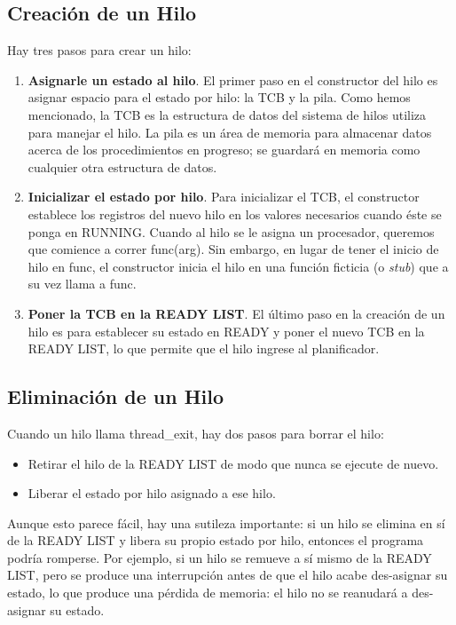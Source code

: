\documentclass[10pt]{book}
\begin{document}
\subsection{Creación de un Hilo}
Hay tres pasos para crear un hilo:
\begin{enumerate}
\item \textbf{Asignarle un estado al hilo}. El primer paso en el constructor del hilo es asignar espacio para el estado por hilo: la TCB y la pila. Como hemos mencionado, la TCB es la estructura de datos del sistema de hilos utiliza para manejar el hilo. La pila es un área de memoria para almacenar datos acerca de los procedimientos en progreso; se guardará en memoria como cualquier otra estructura de datos.

\item \textbf{Inicializar el estado por hilo}. Para inicializar el TCB, el constructor establece los registros del nuevo hilo en los valores necesarios cuando éste se ponga en RUNNING. Cuando al hilo se le asigna un procesador, queremos que comience a correr {\mf func(arg)}. Sin embargo, en lugar de tener el inicio de hilo en {\mf func}, el constructor inicia el hilo en una función ficticia (o  \textit{stub}) que a su vez llama a {\mf func}.

\vspace{0.5cm}
\item \textbf{Poner la TCB en la READY LIST}. El último paso en la creación de un hilo es para establecer su estado en READY y poner el nuevo TCB en la READY LIST, lo que permite que el hilo ingrese al planificador.
\end{enumerate}

\subsection{Eliminación de un Hilo}
Cuando un hilo llama {\mf thread\_exit}, hay dos pasos para borrar el hilo:
\begin{itemize}
\item Retirar el hilo de la READY LIST de modo que nunca se ejecute de nuevo.
\item Liberar el estado por hilo asignado a ese hilo.
\end{itemize}

Aunque esto parece fácil, hay una sutileza importante: si un hilo se elimina en sí de la READY LIST y libera su propio estado por hilo, entonces el programa podría romperse. Por ejemplo, si un hilo se remueve a sí mismo de la READY LIST, pero se produce una interrupción antes de que el hilo acabe des-asignar su estado, lo que produce una pérdida de memoria: el hilo no se reanudará a des-asignar su estado.
\end{document}

